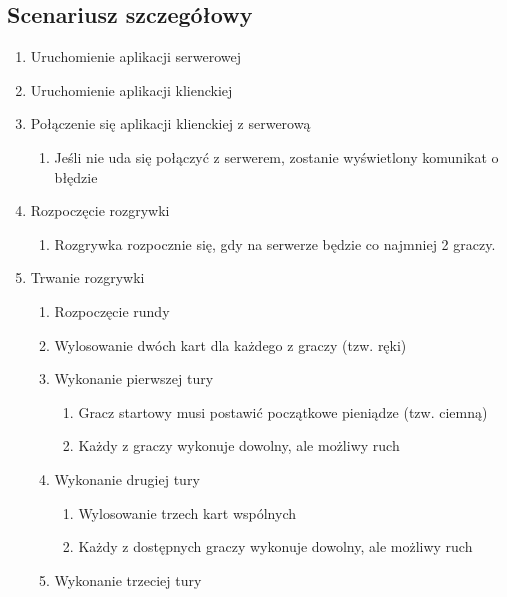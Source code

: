 \documentclass{article}
\begin{document}
    \subsection{Scenariusz szczegółowy}
        \begin{enumerate}
            \item Uruchomienie aplikacji serwerowej
            \item Uruchomienie aplikacji klienckiej
            \item Połączenie się aplikacji klienckiej z serwerową
            \begin{enumerate}
                \item Jeśli nie uda się połączyć z serwerem, zostanie wyświetlony komunikat o błędzie
            \end{enumerate}
            \item Rozpoczęcie rozgrywki
                \begin{enumerate}
                    \item Rozgrywka rozpocznie się, gdy na serwerze będzie co najmniej 2 graczy.
                \end{enumerate}
            \item Trwanie rozgrywki
            \begin{enumerate}
                \item Rozpoczęcie rundy
                \item Wylosowanie dwóch kart dla każdego z graczy (tzw. ręki)
                \item Wykonanie pierwszej tury
                \begin{enumerate}
                    \item Gracz startowy musi postawić początkowe pieniądze (tzw. ciemną)
                    \item Każdy z graczy wykonuje dowolny, ale możliwy ruch
                \end{enumerate}
                \item Wykonanie drugiej tury
                \begin{enumerate}
                    \item Wylosowanie trzech kart wspólnych
                    \item Każdy z dostępnych graczy wykonuje dowolny, ale możliwy ruch
                \end{enumerate}
                \item Wykonanie trzeciej tury
                \begin{enumerate}

\end{enumerate}
\end{enumerate}
\end{enumerate}
\end{document}
